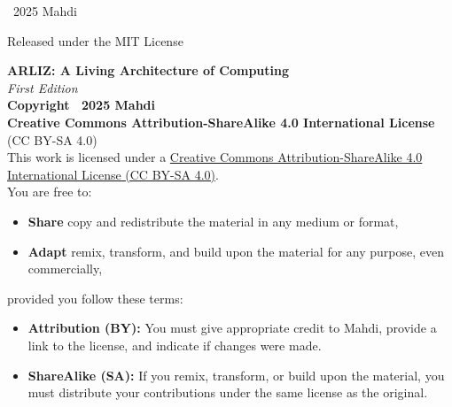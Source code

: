 \documentclass[12pt, oneside, openany]{book}
\begin{document}
\begin{titlepage}
\begin{center}
		\vspace*{1.5cm}
		
		{\small
			\textcopyright\ 2025 Mahdi  
			\par
			Released under the MIT License
		}
	\end{center}
\end{titlepage}

\thispagestyle{empty}
\begin{center}
    \newpage
	 {\footnotesize
		\textbf{ARLIZ: A Living Architecture of Computing}\\
		\vspace{0.5em}
		\textit{First Edition}\\
		\vspace{1.5em}
		\textbf{Copyright \textcopyright\ 2025 Mahdi}\\
		\vspace{1em}
		\textbf{Creative Commons Attribution-ShareAlike 4.0 International License}\\
		(CC BY-SA 4.0)\\
		\vspace{1.5em}
		This work is licensed under a \href{https://creativecommons.org/licenses/by-sa/4.0/}{Creative Commons Attribution-ShareAlike 4.0 International License (CC BY-SA 4.0)}.\\
		You are free to:\newline
		\begin{itemize}\itemsep0pt
			\item \textbf{Share} \— copy and redistribute the material in any medium or format,\newline
			\item \textbf{Adapt} \— remix, transform, and build upon the material for any purpose, even commercially,
		\end{itemize}
		provided you follow these terms:\newline
		\begin{itemize}\itemsep0pt
			\item \textbf{Attribution (BY):} You must give appropriate credit to Mahdi, provide a link to the license, and indicate if changes were made.\\
			\item \textbf{ShareAlike (SA):} If you remix, transform, or build upon the material, you must distribute your contributions under the same license as the original.

\end{itemize}}
\end{center}
\end{document}
